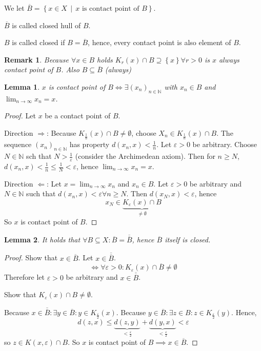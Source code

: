 \documentclass{article}
\newtheorem{lemma}{Lemma}  \numberwithin{lemma}{section}
\newtheorem{remark}{Remark}  \numberwithin{remark}{section}
\newcommand{\set}[1]{\left\{#1\right\}}
\newcommand{\setdef}[2]{\left\{\left.#1\,\middle|\,#2\right.\right\}}
\begin{document}
We let $\overline{B} = \setdef{x \in X}{x \text{ is contact point of } B}$.

$\overline{B}$ is called closed hull of $B$.

$B$ is called closed if $B = \overline{B}$, hence, every contact point is also element of $B$.

\begin{remark}
  Because $\forall x \in B$ holds $K_r(x) \cap B \supseteq \set{x} \forall r > 0$ is $x$ always contact point of $B$.
  Also $B \subseteq \overline{B}$ (always)
\end{remark}

\begin{lemma}
  $x$ is contact point of $B \iff \exists (x_n)_{n\in\mathbb N}$ with $x_n \in B$ and $\lim_{n\to\infty} x_n = x$.
\end{lemma}
\begin{proof}
  Let $x$ be a contact point of $B$.

  Direction $\Rightarrow$:
  Because $K_{\frac1n}(x) \cap B \neq \emptyset$, choose $X_n \in K_{\frac1n}(x) \cap B$.
  The sequence $(x_n)_{n\in\mathbb N}$ has property $d(x_n, x) < \frac1n$.
  Let $\varepsilon > 0$ be arbitrary. Choose $N \in \mathbb N$ sch that $N > \frac1\varepsilon$ (consider the Archimedean axiom).
  Then for $n \geq N$, $d(x_n, x) < \frac1n \leq \frac1N < \varepsilon$, hence $\lim_{n\to\infty} x_n = x$.

  Direction $\Leftarrow$:
  Let $x = \lim_{n\to\infty} x_n$ and $x_n \in B$.
  Let $\varepsilon > 0$ be arbitrary and $N \in \mathbb N$ such that $d(x_n, x) < \varepsilon \forall n \geq N$.
  Then $d(x_N, x) < \varepsilon$, hence
  \[ x_N \in \underbrace{K_{\varepsilon}(x) \cap B}_{\neq \emptyset} \]
  So $x$ is contact point of $B$.
\end{proof}

\begin{lemma}
  It holds that $\forall B \subseteq X: \overline{B} = \overline{\overline{B}}$,
  hence $\overline{B}$ itself is closed.
\end{lemma}
\begin{proof}
  Show that $x \in \overline{B}$. Let $x \in \overline{\overline{B}}$.
  \[ \iff \forall \varepsilon > 0: K_{\varepsilon}(x) \cap \overline{B} \neq \emptyset \]
  Therefore let $\varepsilon > 0$ be arbitrary and $x \in \overline{\overline{B}}$.

  Show that $K_{\varepsilon}(x) \cap B \neq \emptyset$.

  Because $x \in \overline{\overline{B}}: \exists y \in \overline{B}: y \in K_{\frac\varepsilon2}(x)$.
  Because $y \in \overline{B}: \exists z \in B: z \in K_{\frac\varepsilon2}(y)$. Hence,
  \[ d(z,x) \leq \underbrace{d(z,y)}_{<\frac\varepsilon2} + \underbrace{d(y,x)}_{<\frac\varepsilon2} < \varepsilon \]
  so $z \in K(x,\varepsilon) \cap B$. So $x$ is contact point of $B \implies x \in \overline{B}$.
\end{proof}
\end{document}
